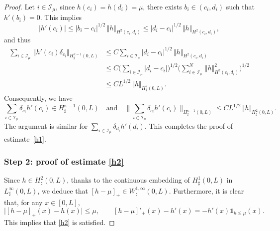 \documentclass[JEP,XML,SOM,Unicode,NoFloatCountersInSection]{cedram}
\let\mathcal\mathscr
\theoremstyle{remark}
\theoremstyle{definition}
\newcommand{\norme}[1]{\,\Vert #1\Vert}
\begin{document}
\begin{proof}
Let $i \in \mathcal I_{\mu}$, since $h(c_{i})=h(d_{i})=\mu$, there exists $b_{i}\in(c_{i},d_{i})$ such that $h'(b_{i})=0$. This implies
\[\vert h'(c_{i})\vert\leq \vert b_{i}-c_{i}\vert^{1/2}\norme{h}_{H^{2}(c_{i},d_{i})} \leq \vert d_{i}-c_{i}\vert^{1/2}\norme{h}_{H^{2}(c_{i},d_{i})},\]
and thus
\begin{equation}\label{regularity.second.derivative}
\begin{aligned}
\sum_{i \in \mathcal I_{\mu}} \norme{h'(c_{i})\delta_{c_{i}}}_{H_\sharp^{\kappa-1}(0,L)}&{}\leq C\sum_{i \in \mathcal I_{\mu}}\vert d_{i}-c_{i}\vert^{1/2}\norme{h}_{H^{2}(c_{i},d_{i})}\\
&\leq C\biggl(\sum_{i \in \mathcal I_{\mu}} \vert d_{i}-c_{i}\vert\biggr)^{1/2}\biggl(\sum_{i \in \mathcal I_{\mu}}^{N}\norme{h}_{H^{2}(c_{i},d_{i})}^{2}\biggr)^{1/2}\\
&\leq CL^{1/2}\norme{h}_{H_\sharp^{2}(0,L)}.
\end{aligned}
\end{equation}
Consequently, we have
\[
\sum_{i\in \mathcal I_{\mu}}\delta_{c_{i} }h{'}(c_{i}) \in H^{\kappa -1}_{\sharp}(0,L) \quad\text{and}\quad \biggl\|\sum_{i\in \mathcal I_{\mu}}\delta_{c_{i} }h{'}(c_{i})\biggr\|_{H^{\kappa -1}_{\sharp}(0,L)} \leq CL^{1/2}\norme{h}_{H_\sharp^{2}(0,L)}.
\]
The argument is similar for $\sum_{i\in \mathcal I_{\mu}}\delta_{d_{i}}h'(d_{i})$. This completes the proof of estimate~\eqref{h1}.

\subsubsection*{Step 2: proof of estimate \eqref{h2}} Since $h\in H_\sharp^2(0, L)$, thanks to the continuous embedding of $H_\sharp^1(0, L)$ in $L_\sharp^\infty(0, L)$, we deduce that $[h-\mu]_{+}\in W_\sharp^{1,\infty}(0, L)$.
Furthermore, it is clear that, for any $ x\in [0, L]$,
\[
\vert [h-\mu]_{+}(x)-h(x)\vert \leq \mu, \qquad [h-\mu]'_{+}(x)-h'(x) = -h'(x) \mathds{1}_{h\leq\mu}(x).
\]
This implies that \eqref{h2} is satisfied.
\end{proof}
\end{document}
